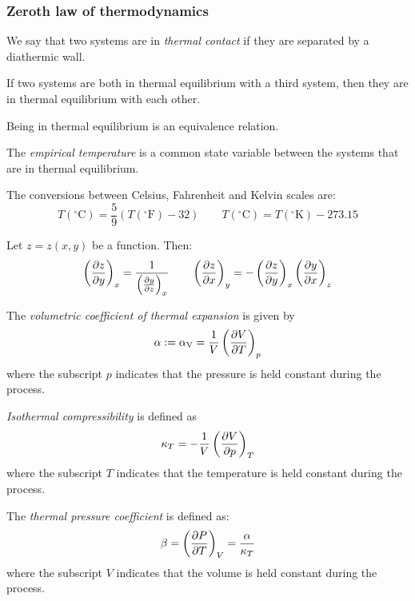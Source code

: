 \documentclass[../../../main.tex]{subfiles}
\begin{document}
\begin{multicols}{2}
  \subsubsection{Zeroth law of thermodynamics}
  \begin{definition}
    We say that two systems are in \emph{thermal contact} if they are separated by a diathermic wall.
  \end{definition}
  \begin{law}
    If two systems are both in thermal equilibrium with a third system, then they are in thermal equilibrium with each other.
  \end{law}
  \begin{corollary}
    Being in thermal equilibrium is an equivalence relation.
  \end{corollary}
  \begin{definition}
    The \emph{empirical temperature} is a common state variable between the systems that are in thermal equilibrium.
  \end{definition}
  \begin{proposition}
    The conversions between Celsius, Fahrenheit and Kelvin scales are:
    $$T(^\circ\text{C})=\frac{5}{9}\left(T(^\circ\text{F})-32\right)\qquad T(^\circ\text{C})=T(^\circ\text{K})-273.15$$
  \end{proposition}
  \begin{proposition}
    Let $z=z(x,y)$ be a function. Then:
    $$\left(\pdv{z}{y}\right)_x=\frac{1}{\left(\pdv{y}{z}\right)_x}\qquad\left(\pdv{z}{x}\right)_y=-\left(\pdv{z}{y}\right)_x\left(\pdv{y}{x}\right)_z$$
  \end{proposition}
  \begin{definition}
    The \emph{volumetric coefficient of thermal expansion} is given by
    $$\alpha:=\alpha_\text{V}=\frac{1}{V}\left(\pdv{V}{T}\right)_p$$
    where the subscript $p$ indicates that the pressure is held constant during the process.
  \end{definition}
  \begin{definition}[Compressibility]
    \emph{Isothermal compressibility} is defined as
    $$\kappa_T=-\frac{1}{V}\left(\pdv{V}{p}\right)_T$$
    where the subscript $T$ indicates that the temperature is held constant during the process.
  \end{definition}
  \begin{definition}
    The \emph{thermal pressure coefficient} is defined as:
    $$\beta=\left(\pdv{P}{T}\right)_V=\frac{\alpha}{\kappa_T}$$
    where the subscript $V$ indicates that the volume is held constant during the process.
  \end{definition}

\end{multicols}
\end{document}

